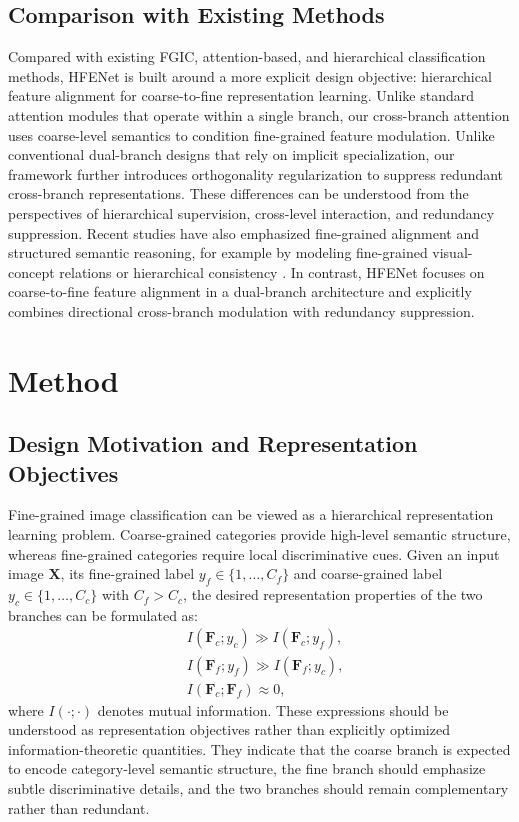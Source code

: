\documentclass[pdflatex,sn-mathphys-num]{sn-jnl}
\theoremstyle{thmstyleone}%
\theoremstyle{thmstyletwo}%
\theoremstyle{thmstylethree}%
\begin{document}
\subsection{Comparison with Existing Methods}
Compared with existing FGIC, attention-based, and hierarchical classification methods, HFENet is built around a more explicit design objective: hierarchical feature alignment for coarse-to-fine representation learning. 
Unlike standard attention modules that operate within a single branch, our cross-branch attention uses coarse-level semantics to condition fine-grained feature modulation. 
Unlike conventional dual-branch designs that rely on implicit specialization, our framework further introduces orthogonality regularization to suppress redundant cross-branch representations. 
These differences can be understood from the perspectives of hierarchical supervision, cross-level interaction, and redundancy suppression.
Recent studies have also emphasized fine-grained alignment and structured semantic reasoning, for example by modeling fine-grained visual-concept relations or hierarchical consistency \cite{xie2025dotcbm,gao2025chbc}. 
In contrast, HFENet focuses on coarse-to-fine feature alignment in a dual-branch architecture and explicitly combines directional cross-branch modulation with redundancy suppression.

\section{Method}
\label{sec:method}


\subsection{Design Motivation and Representation Objectives}

Fine-grained image classification can be viewed as a hierarchical representation learning problem. Coarse-grained categories provide high-level semantic structure, whereas fine-grained categories require local discriminative cues. Given an input image $\mathbf{X}$, its fine-grained label $y_f \in \{1,\dots,C_f\}$ and coarse-grained label $y_c \in \{1,\dots,C_c\}$ with $C_f > C_c$, the desired representation properties of the two branches can be formulated as:
\begin{equation}
\begin{aligned}
&I(\mathbf{F}_c; y_c) \gg I(\mathbf{F}_c; y_f), \\
&I(\mathbf{F}_f; y_f) \gg I(\mathbf{F}_f; y_c), \\
&I(\mathbf{F}_c; \mathbf{F}_f) \approx 0,
\end{aligned}
\label{eq:information_constraints}
\end{equation}
where $I(\cdot;\cdot)$ denotes mutual information. These expressions should be understood as representation objectives rather than explicitly optimized information-theoretic quantities. They indicate that the coarse branch is expected to encode category-level semantic structure, the fine branch should emphasize subtle discriminative details, and the two branches should remain complementary rather than redundant.
\end{document}

